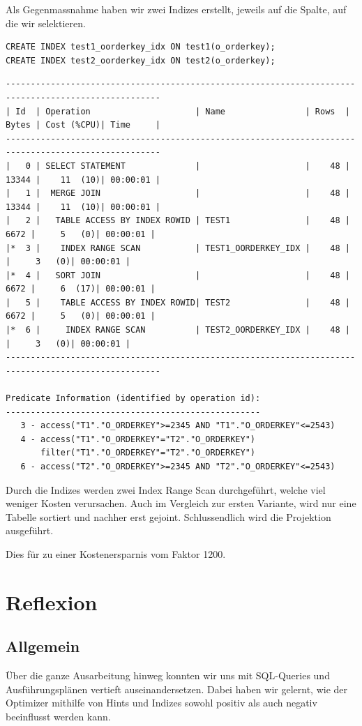 \documentclass[10pt]{article}
\begin{document}
Als Gegenmassnahme haben wir zwei Indizes erstellt, jeweils auf die Spalte, auf 
die wir selektieren. 
\begin{lstlisting}[style=sql]
CREATE INDEX test1_oorderkey_idx ON test1(o_orderkey);
CREATE INDEX test2_oorderkey_idx ON test2(o_orderkey);
\end{lstlisting}
\begin{lstlisting}[style=queryexecutionplanSmall]
-----------------------------------------------------------------------------------------------------
| Id  | Operation                     | Name                | Rows  | Bytes | Cost (%CPU)| Time     |
-----------------------------------------------------------------------------------------------------
|   0 | SELECT STATEMENT              |                     |    48 | 13344 |    11  (10)| 00:00:01 |
|   1 |  MERGE JOIN                   |                     |    48 | 13344 |    11  (10)| 00:00:01 |
|   2 |   TABLE ACCESS BY INDEX ROWID | TEST1               |    48 |  6672 |     5   (0)| 00:00:01 |
|*  3 |    INDEX RANGE SCAN           | TEST1_OORDERKEY_IDX |    48 |       |     3   (0)| 00:00:01 |
|*  4 |   SORT JOIN                   |                     |    48 |  6672 |     6  (17)| 00:00:01 |
|   5 |    TABLE ACCESS BY INDEX ROWID| TEST2               |    48 |  6672 |     5   (0)| 00:00:01 |
|*  6 |     INDEX RANGE SCAN          | TEST2_OORDERKEY_IDX |    48 |       |     3   (0)| 00:00:01 |
-----------------------------------------------------------------------------------------------------
 
Predicate Information (identified by operation id):
---------------------------------------------------
   3 - access("T1"."O_ORDERKEY">=2345 AND "T1"."O_ORDERKEY"<=2543)
   4 - access("T1"."O_ORDERKEY"="T2"."O_ORDERKEY")
       filter("T1"."O_ORDERKEY"="T2"."O_ORDERKEY")
   6 - access("T2"."O_ORDERKEY">=2345 AND "T2"."O_ORDERKEY"<=2543)
\end{lstlisting}
Durch die Indizes werden zwei Index Range Scan durchgeführt, welche viel weniger Kosten verursachen. 
Auch im Vergleich zur ersten Variante, wird nur eine Tabelle sortiert und nachher erst gejoint. 
Schlussendlich wird die Projektion ausgeführt.

Dies für zu einer Kostenersparnis vom Faktor 1200.

\section{Reflexion}
\subsection{Allgemein}
Über die ganze Ausarbeitung hinweg konnten wir uns mit SQL-Queries und Ausführungsplänen vertieft auseinandersetzen.
Dabei haben wir gelernt, wie der Optimizer mithilfe von Hints und Indizes sowohl positiv als auch negativ beeinflusst werden kann.
\end{document}
